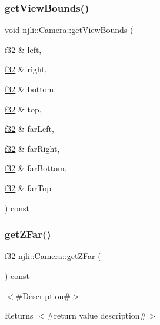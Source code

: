 \subsubsection{\texorpdfstring{get\+View\+Bounds()}{getViewBounds()}}
{\footnotesize\ttfamily \mbox{\hyperlink{_thread_8h_af1e856da2e658414cb2456cb6f7ebc66}{void}} njli\+::\+Camera\+::get\+View\+Bounds (\begin{DoxyParamCaption}\item[{\mbox{\hyperlink{_util_8h_a5f6906312a689f27d70e9d086649d3fd}{f32}} \&}]{left,  }\item[{\mbox{\hyperlink{_util_8h_a5f6906312a689f27d70e9d086649d3fd}{f32}} \&}]{right,  }\item[{\mbox{\hyperlink{_util_8h_a5f6906312a689f27d70e9d086649d3fd}{f32}} \&}]{bottom,  }\item[{\mbox{\hyperlink{_util_8h_a5f6906312a689f27d70e9d086649d3fd}{f32}} \&}]{top,  }\item[{\mbox{\hyperlink{_util_8h_a5f6906312a689f27d70e9d086649d3fd}{f32}} \&}]{far\+Left,  }\item[{\mbox{\hyperlink{_util_8h_a5f6906312a689f27d70e9d086649d3fd}{f32}} \&}]{far\+Right,  }\item[{\mbox{\hyperlink{_util_8h_a5f6906312a689f27d70e9d086649d3fd}{f32}} \&}]{far\+Bottom,  }\item[{\mbox{\hyperlink{_util_8h_a5f6906312a689f27d70e9d086649d3fd}{f32}} \&}]{far\+Top }\end{DoxyParamCaption}) const\hspace{0.3cm}{\ttfamily [protected]}}

\mbox{\label{classnjli_1_1_camera_a3e5c14ce4f79b8ab666390872ba9590a}} 
\subsubsection{\texorpdfstring{get\+Z\+Far()}{getZFar()}}
{\footnotesize\ttfamily \mbox{\hyperlink{_util_8h_a5f6906312a689f27d70e9d086649d3fd}{f32}} njli\+::\+Camera\+::get\+Z\+Far (\begin{DoxyParamCaption}{ }\end{DoxyParamCaption}) const}

$<$\#\+Description\#$>$

\begin{DoxyReturn}{Returns}
$<$\#return value description\#$>$ 
\end{DoxyReturn}
\mbox{\label{classnjli_1_1_camera_ae388cdacbbe0a24c4048f063b83687a8}} 
